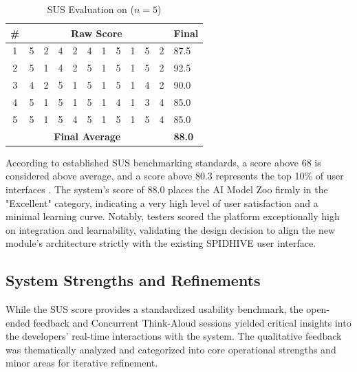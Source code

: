 \documentclass{icsthesis}
\begin{document}
\begin{mainmatter}
            \begin{table}[htbp]
                \centering
                \caption{SUS Evaluation on ($n=5$)}
                \begin{tabular*}{\linewidth}{@{\extracolsep{\fill}} cccccccccccl }
                \toprule
                \textbf{\#} & \multicolumn{10}{c}{\textbf{Raw Score}} & \textbf{Final} \\ 
                \midrule
                1 & 5 & 2 & 4 & 2 & 4 & 1 & 5 & 1 & 5 & 2 & 87.5 \\ 
                2 & 5 & 1 & 4 & 2 & 5 & 1 & 5 & 1 & 5 & 2 & 92.5 \\ 
                3 & 4 & 2 & 5 & 1 & 5 & 1 & 5 & 1 & 4 & 2 & 90.0 \\ 
                4 & 5 & 1 & 5 & 1 & 5 & 1 & 4 & 1 & 3 & 4 & 85.0 \\ 
                5 & 5 & 1 & 5 & 4 & 5 & 1 & 5 & 1 & 5 & 4 & 85.0 \\ 
                \midrule
                \multicolumn{11}{c}{\textbf{Final Average}} & \textbf{88.0} \\ 
                \bottomrule
                \end{tabular*}
            \end{table}
            
            According to established SUS benchmarking standards, a score above 68 is considered above average, and a score above 80.3 represents the top 10\% of user interfaces \cite{Sauro}. The system’s score of 88.0 places the AI Model Zoo firmly in the "Excellent" category, indicating a very high level of user satisfaction and a minimal learning curve. Notably, testers scored the platform exceptionally high on integration and learnability, validating the design decision to align the new module's architecture strictly with the existing SPIDHIVE user interface.
            
            \subsection{System Strengths and Refinements}
            While the SUS score provides a standardized usability benchmark, the open-ended feedback and Concurrent Think-Aloud sessions yielded critical insights into the developers' real-time interactions with the system. The qualitative feedback was thematically analyzed and categorized into core operational strengths and minor areas for iterative refinement.
            

\end{mainmatter}
\end{document}
